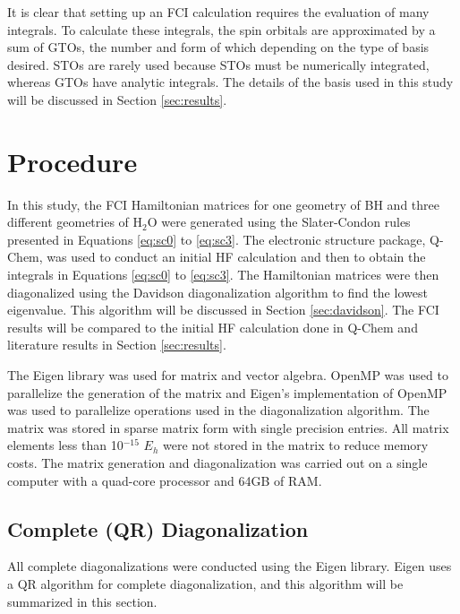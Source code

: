 \documentclass[final,3p,times,twocolumn]{elsarticle}
\begin{document}
It is clear that setting up an FCI calculation requires the evaluation of many integrals. To calculate these integrals, the spin orbitals are approximated by a sum of GTOs,\cite{gto} the number and form of which depending on the type of basis desired. STOs are rarely used because STOs must be numerically integrated, whereas GTOs have analytic integrals.\cite{szabo} The details of the basis used in this study will be discussed in Section \ref{sec:results}.

\section{Procedure}

In this study, the FCI Hamiltonian matrices for one geometry of BH and three different geometries of H$_2$O were generated using the Slater-Condon rules presented in Equations \eqref{eq:sc0} to \eqref{eq:sc3}. The electronic structure package, Q-Chem,\cite{qchem} was used to conduct an initial HF calculation and then to obtain the integrals in Equations \eqref{eq:sc0} to \eqref{eq:sc3}. The Hamiltonian matrices were then diagonalized using the Davidson diagonalization algorithm\cite{davidson,liu} to find the lowest eigenvalue. This algorithm will be discussed in Section \ref{sec:davidson}. The FCI results will be compared to the initial HF calculation done in Q-Chem and literature results\cite{cccbdb,handy-1983} in Section \ref{sec:results}.

The Eigen library was used for matrix and vector algebra.\cite{eigen} OpenMP was used to parallelize the generation of the matrix and Eigen's implementation of OpenMP was used to parallelize operations used in the diagonalization algorithm.\cite{openmp} The matrix was stored in sparse matrix form with single precision entries. All matrix elements less than 10$^{-15}$ $E_h$ were not stored in the matrix to reduce memory costs. %
The matrix generation and diagonalization was carried out on a single computer with a quad-core processor and 64GB of RAM.


\subsection{Complete (QR) Diagonalization} \label{sec:qr}
All complete diagonalizations were conducted using the Eigen library.\cite{eigen} Eigen uses a QR algorithm\cite{qr} for complete diagonalization, and this algorithm will be summarized in this section.
\end{document}
